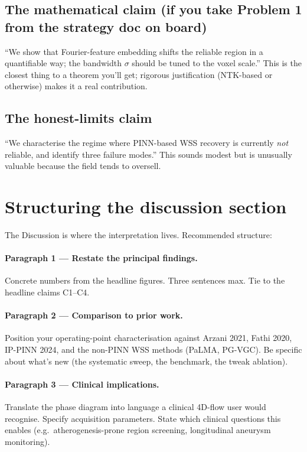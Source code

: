\documentclass[11pt]{article}
\begin{document}
\subsection*{The mathematical claim (if you take Problem 1 from the strategy doc on board)}
``We show that Fourier-feature embedding shifts the reliable region in a quantifiable way; the bandwidth $\sigma$ should be tuned to the voxel scale.'' This is the closest thing to a theorem you'll get; rigorous justification (NTK-based or otherwise) makes it a real contribution.

\subsection*{The honest-limits claim}
``We characterise the regime where PINN-based WSS recovery is currently \emph{not} reliable, and identify three failure modes.'' This sounds modest but is unusually valuable because the field tends to oversell.

\section{Structuring the discussion section}

The Discussion is where the interpretation lives. Recommended structure:

\paragraph{Paragraph 1 --- Restate the principal findings.} Concrete numbers from the headline figures. Three sentences max. Tie to the headline claims C1--C4.

\paragraph{Paragraph 2 --- Comparison to prior work.} Position your operating-point characterisation against Arzani 2021, Fathi 2020, IP-PINN 2024, and the non-PINN WSS methods (PaLMA, PG-VGC). Be specific about what's new (the systematic sweep, the benchmark, the tweak ablation).

\paragraph{Paragraph 3 --- Clinical implications.} Translate the phase diagram into language a clinical 4D-flow user would recognise. Specify acquisition parameters. State which clinical questions this enables (e.g.\ atherogenesis-prone region screening, longitudinal aneurysm monitoring).
\end{document}
